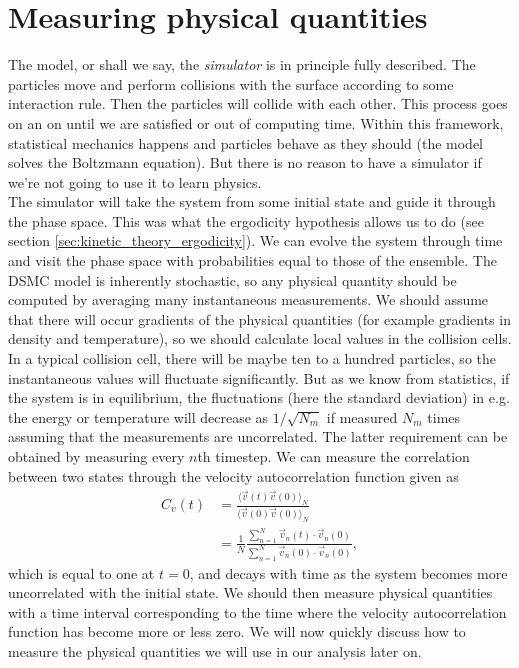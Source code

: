 \section{Measuring physical quantities}
\label{sec:dsmc_measuring_physical_quantities}
The model, or shall we say, the \textit{simulator} is in principle fully described. The particles move and perform collisions with the surface according to some interaction rule. Then the particles will collide with each other. This process goes on an on until we are satisfied or out of computing time. Within this framework, statistical mechanics happens and particles behave as they should (the model solves the Boltzmann equation). But there is no reason to have a simulator if we're not going to use it to learn physics.\\
The simulator will take the system from some initial state and guide it through the phase space. This was what the ergodicity hypothesis allows us to do (see section \ref{sec:kinetic_theory_ergodicity}). We can evolve the system through time and visit the phase space with probabilities equal to those of the ensemble. The DSMC model is inherently stochastic, so any physical quantity should be computed by averaging many instantaneous measurements. We should assume that there will occur gradients of the physical quantities (for example gradients in density and temperature), so we should calculate local values in the collision cells. In a typical collision cell, there will be maybe ten to a hundred particles, so the instantaneous values will fluctuate significantly. But as we know from statistics, if the system is in equilibrium, the fluctuations (here the standard deviation) in e.g. the energy or temperature will decrease as $1/\sqrt{N_m}$ if measured $N_m$ times assuming that the measurements are uncorrelated. The latter requirement can be obtained by measuring every $n$th timestep. We can measure the correlation between two states through the velocity autocorrelation function given as
\begin{align}
	C_v(t) &= \frac{\langle \vec v(t)\vec v(0)\rangle_N}{\langle \vec v(0)\vec v(0)\rangle_N}\\
	&= \frac{1}{N}\frac{\sum_{n=1}^N \vec v_n(t)\cdot\vec v_n(0)}{\sum_{n=1}^N \vec v_n(0)\cdot\vec v_n(0)},
\end{align}
which is equal to one at $t=0$, and decays with time as the system becomes more uncorrelated with the initial state. We should then measure physical quantities with a time interval corresponding to the time where the velocity autocorrelation function has become more or less zero. We will now quickly discuss how to measure the physical quantities we will use in our analysis later on. 
